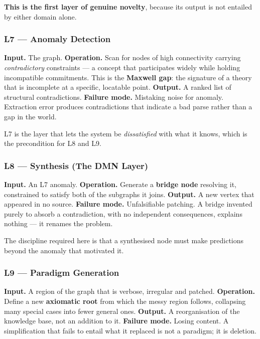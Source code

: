 \documentclass[
  11pt,
  a4paper,
]{article}
\begin{document}
\textbf{This is the first layer of genuine novelty}, because its output
is not entailed by either domain alone.

\subsubsection{L7 --- Anomaly Detection}\label{l7-anomaly-detection}

\textbf{Input.} The graph. \textbf{Operation.} Scan for nodes of high
connectivity carrying \emph{contradictory} constraints --- a concept
that participates widely while holding incompatible commitments. This is
the \textbf{Maxwell gap}: the signature of a theory that is incomplete
at a specific, locatable point. \textbf{Output.} A ranked list of
structural contradictions. \textbf{Failure mode.} Mistaking noise for
anomaly. Extraction error produces contradictions that indicate a bad
parse rather than a gap in the world.

L7 is the layer that lets the system be \emph{dissatisfied} with what it
knows, which is the precondition for L8 and L9.

\subsubsection{L8 --- Synthesis (The DMN
Layer)}\label{l8-synthesis-the-dmn-layer}

\textbf{Input.} An L7 anomaly. \textbf{Operation.} Generate a
\textbf{bridge node} resolving it, constrained to satisfy both of the
subgraphs it joins. \textbf{Output.} A new vertex that appeared in no
source. \textbf{Failure mode.} Unfalsifiable patching. A bridge invented
purely to absorb a contradiction, with no independent consequences,
explains nothing --- it renames the problem.

The discipline required here is that a synthesised node must make
predictions beyond the anomaly that motivated it.

\subsubsection{L9 --- Paradigm Generation}\label{l9-paradigm-generation}

\textbf{Input.} A region of the graph that is verbose, irregular and
patched. \textbf{Operation.} Define a new \textbf{axiomatic root} from
which the messy region follows, collapsing many special cases into fewer
general ones. \textbf{Output.} A reorganisation of the knowledge base,
not an addition to it. \textbf{Failure mode.} Losing content. A
simplification that fails to entail what it replaced is not a paradigm;
it is deletion.
\end{document}
